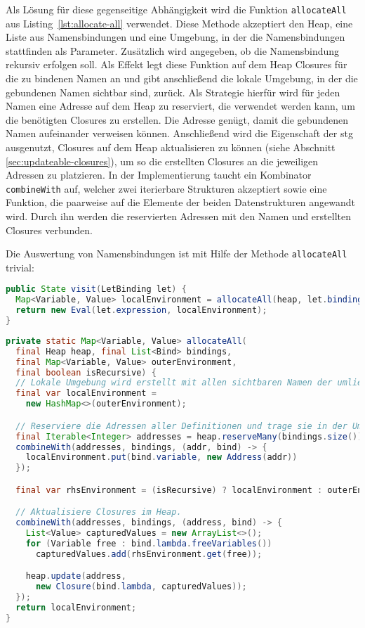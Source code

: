 Als Lösung für diese gegenseitige Abhängigkeit wird die Funktion \texttt{allocateAll} aus Listing~\ref{lst:allocate-all} verwendet.
Diese Methode akzeptiert den Heap, eine Liste aus Namensbindungen und eine Umgebung, in der die Namensbindungen stattfinden als Parameter.
Zusätzlich wird angegeben, ob die Namensbindung rekursiv erfolgen soll.
Als Effekt legt diese Funktion auf dem Heap Closures für die zu bindenen Namen an und gibt anschließend die lokale Umgebung, in der die gebundenen Namen sichtbar sind, zurück.
Als Strategie hierfür wird für jeden Namen eine Adresse auf dem Heap zu reserviert, die verwendet werden kann, um die benötigten Closures zu erstellen.
Die Adresse genügt, damit die gebundenen Namen aufeinander verweisen können.
Anschließend wird die Eigenschaft der \gls{stg} ausgenutzt, Closures auf dem Heap aktualisieren zu können (siehe Abschnitt \ref{sec:updateable-closures}), um so die erstellten Closures an die jeweiligen Adressen zu platzieren.
In der Implementierung taucht ein Kombinator \texttt{combineWith} auf, welcher zwei iterierbare Strukturen akzeptiert sowie eine Funktion, die paarweise auf die Elemente der beiden Datenstrukturen angewandt wird.
Durch ihn werden die reservierten Adressen mit den Namen und erstellten Closures verbunden.

Die Auswertung von Namensbindungen ist mit Hilfe der Methode \texttt{allocateAll} trivial:

\begin{lstlisting}[language=java]
public State visit(LetBinding let) {
  Map<Variable, Value> localEnvironment = allocateAll(heap, let.bindings, this.localEnvironment, let.isRecursive);
  return new Eval(let.expression, localEnvironment);
}
\end{lstlisting}


\begin{lstlisting}[language=java, caption={Funktion \texttt{allocateAll} zum Anlegen rekursiver Namensbindungen}, label={lst:allocate-all}]
private static Map<Variable, Value> allocateAll(
  final Heap heap, final List<Bind> bindings,
  final Map<Variable, Value> outerEnvironment,
  final boolean isRecursive) {
  // Lokale Umgebung wird erstellt mit allen sichtbaren Namen der umliegenden Umgebung.
  final var localEnvironment =
    new HashMap<>(outerEnvironment);

  // Reserviere die Adressen aller Definitionen und trage sie in der Umgebung ein.
  final Iterable<Integer> addresses = heap.reserveMany(bindings.size());
  combineWith(addresses, bindings, (addr, bind) -> {
    localEnvironment.put(bind.variable, new Address(addr))
  });

  final var rhsEnvironment = (isRecursive) ? localEnvironment : outerEnvironment;

  // Aktualisiere Closures im Heap.
  combineWith(addresses, bindings, (address, bind) -> {
    List<Value> capturedValues = new ArrayList<>();
    for (Variable free : bind.lambda.freeVariables())
      capturedValues.add(rhsEnvironment.get(free));

    heap.update(address,
      new Closure(bind.lambda, capturedValues));
  });
  return localEnvironment;
}
\end{lstlisting}


